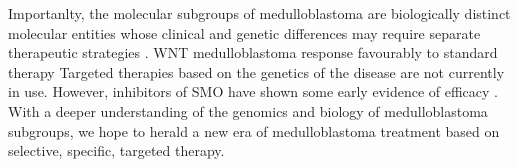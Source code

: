 Importanlty, the molecular subgroups of medulloblastoma are biologically distinct molecular entities whose clinical and genetic differences may require separate therapeutic strategies . WNT medulloblastoma response favourably to standard therapy  Targeted therapies based on the genetics of the disease are not currently in use. However, inhibitors of SMO have shown some early evidence of efficacy . With a deeper understanding of the genomics and biology of medulloblastoma subgroups, we hope to herald a new era of medulloblastoma treatment based on selective, specific, targeted therapy.







